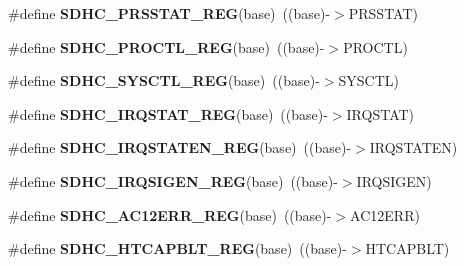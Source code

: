 \begin{DoxyCompactItemize}
\item 
\#define {\bfseries S\+D\+H\+C\+\_\+\+P\+R\+S\+S\+T\+A\+T\+\_\+\+R\+EG}(base)~((base)-\/$>$P\+R\+S\+S\+T\+AT)\hypertarget{group__SDHC__Register__Accessor__Macros_ga751116a9a35fb6faec53ba0b847525c7}{}\label{group__SDHC__Register__Accessor__Macros_ga751116a9a35fb6faec53ba0b847525c7}

\item 
\#define {\bfseries S\+D\+H\+C\+\_\+\+P\+R\+O\+C\+T\+L\+\_\+\+R\+EG}(base)~((base)-\/$>$P\+R\+O\+C\+TL)\hypertarget{group__SDHC__Register__Accessor__Macros_ga386015063027d9a390c0f2209a6827a3}{}\label{group__SDHC__Register__Accessor__Macros_ga386015063027d9a390c0f2209a6827a3}

\item 
\#define {\bfseries S\+D\+H\+C\+\_\+\+S\+Y\+S\+C\+T\+L\+\_\+\+R\+EG}(base)~((base)-\/$>$S\+Y\+S\+C\+TL)\hypertarget{group__SDHC__Register__Accessor__Macros_ga3fc6bad4325e3b66ebfcdee82911dac5}{}\label{group__SDHC__Register__Accessor__Macros_ga3fc6bad4325e3b66ebfcdee82911dac5}

\item 
\#define {\bfseries S\+D\+H\+C\+\_\+\+I\+R\+Q\+S\+T\+A\+T\+\_\+\+R\+EG}(base)~((base)-\/$>$I\+R\+Q\+S\+T\+AT)\hypertarget{group__SDHC__Register__Accessor__Macros_ga4b5e238d4c3181db38f4eb901ca6a80b}{}\label{group__SDHC__Register__Accessor__Macros_ga4b5e238d4c3181db38f4eb901ca6a80b}

\item 
\#define {\bfseries S\+D\+H\+C\+\_\+\+I\+R\+Q\+S\+T\+A\+T\+E\+N\+\_\+\+R\+EG}(base)~((base)-\/$>$I\+R\+Q\+S\+T\+A\+T\+EN)\hypertarget{group__SDHC__Register__Accessor__Macros_gad9da545edf8c07a3c5cf4415a1cbb757}{}\label{group__SDHC__Register__Accessor__Macros_gad9da545edf8c07a3c5cf4415a1cbb757}

\item 
\#define {\bfseries S\+D\+H\+C\+\_\+\+I\+R\+Q\+S\+I\+G\+E\+N\+\_\+\+R\+EG}(base)~((base)-\/$>$I\+R\+Q\+S\+I\+G\+EN)\hypertarget{group__SDHC__Register__Accessor__Macros_ga649b5c6295c4f2f2f2edcf12d8aa2819}{}\label{group__SDHC__Register__Accessor__Macros_ga649b5c6295c4f2f2f2edcf12d8aa2819}

\item 
\#define {\bfseries S\+D\+H\+C\+\_\+\+A\+C12\+E\+R\+R\+\_\+\+R\+EG}(base)~((base)-\/$>$A\+C12\+E\+RR)\hypertarget{group__SDHC__Register__Accessor__Macros_gaad26f27b63f507e04cda527b7217c868}{}\label{group__SDHC__Register__Accessor__Macros_gaad26f27b63f507e04cda527b7217c868}

\item 
\#define {\bfseries S\+D\+H\+C\+\_\+\+H\+T\+C\+A\+P\+B\+L\+T\+\_\+\+R\+EG}(base)~((base)-\/$>$H\+T\+C\+A\+P\+B\+LT)\hypertarget{group__SDHC__Register__Accessor__Macros_gab9b310244dc343d6cbdc1d1b38eff1f4}{}\label{group__SDHC__Register__Accessor__Macros_gab9b310244dc343d6cbdc1d1b38eff1f4}


\end{DoxyCompactItemize}
